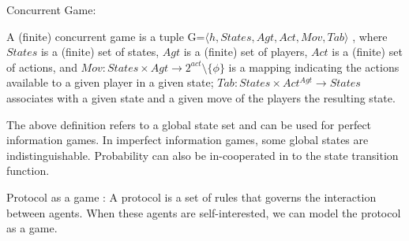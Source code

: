 \begin{definition}
	Concurrent Game:
\end{definition}

\begin{definition}
	A (finite) concurrent game is a \newline
	tuple G=$\langle h,States,Agt,Act,Mov,Tab \rangle$
	, where $States$ is a \newline 
	(finite) set of states,
	$Agt$ is a  (finite) set of players, $Act$ is a  (finite) set of actions, and
	$Mov : States \times Agt \rightarrow 2^{act} \setminus \{\phi\}$ is a mapping indicating the actions available to a given player in a given state; \newline
	$Tab : States \times Act^{Agt} \rightarrow States$ associates  with  a  given  state  and  a  given move of the players the resulting state.
\end{definition} \cite{bouyer2012concurrent}
The above definition refers to a global state set and can be used for perfect information games. In imperfect information games, some global states are indistinguishable. Probability can also be in-cooperated in to the state transition function.  \cite{gripon2009qualitative}

\begin{definition}
	Protocol as a game : A protocol is a set of rules that governs the interaction between agents. When these agents are self-interested, we can model the protocol as a game. 	
\end{definition}


